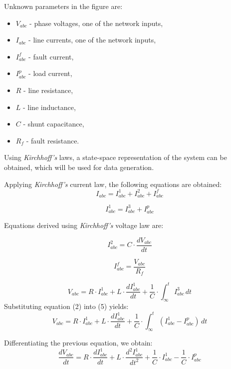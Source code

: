 \documentclass[11pt]{IEEEtran}
\begin{document}
Unknown parameters in the figure are:
   \begin{itemize}
    \item \( V_{abc} \) - phase voltages, one of the network inputs,
    \item \( I_{abc} \) - line currents, one of the network inputs,
    \item \( I_{abc}^f \) - fault current,
    \item \( I_{abc}^p \) - load current,
    \item \( R \) - line resistance,
    \item \( L \) - line inductance,
    \item \( C \) - shunt capacitance,
    \item \( R_f \) - fault resistance.
   \end{itemize}
Using \textit{Kirchhoff's} laws, a state-space representation of the system can be obtained, which will be used for data generation.

Applying \textit{Kirchhoff's} current law, the following equations are obtained:
\begin{equation}
    I_{abc} = I_{abc}^{1} + I_{abc}^{2} + I_{abc}^{f}
\end{equation}

\begin{equation}
    I_{abc}^{1} = I_{abc}^{3} + I_{abc}^{p} 
\end{equation}

Equations derived using \textit{Kirchhoff's} voltage law are:

\begin{equation}
    I_{abc}^{2} = C \cdot \frac{dV_{abc}}{dt} 
\end{equation}

\begin{equation}
    I_{abc}^{f} = \frac{V_{abc}}{R_f}
\end{equation}

\begin{equation}
    V_{abc} = R \cdot I_{abc}^{1} + L \cdot \frac{d I_{abc}^{1}}{dt} + \frac{1}{C} \cdot \int_{ \infty}^{t} I_{abc}^{3} \, dt
\end{equation}
Substituting equation (2) into (5) yields:
\begin{equation}
    V_{abc} = R \cdot I_{abc}^{1} + L \cdot \frac{d I_{abc}^{1}}{dt} + \frac{1}{C} \cdot \int_{ \infty}^{t} (I_{abc}^{1} - I_{abc}^{p})  \, dt
\end{equation}

Differentiating the previous equation, we obtain:
\begin{equation}
   \frac{d V_{abc}}{dt} = R \cdot  \frac{d I_{abc}^{1}}{dt} + L \cdot \frac{d^2 I_{abc}^{1}}{dt^2} + \frac{1}{C} \cdot I_{abc}^{1} - \frac{1}{C} \cdot I_{abc}^{p}
\end{equation}
\end{document}
